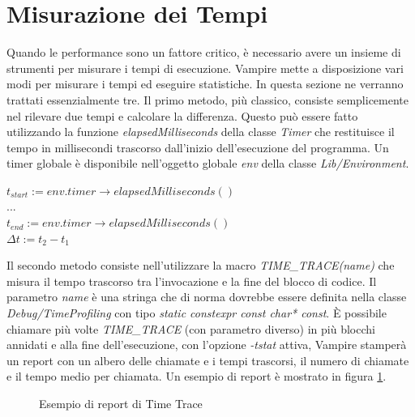 \documentclass[./main.tex]{subfiles}
\begin{document}
\section{Misurazione dei Tempi} \label{sec:vampire_time}
Quando le performance sono un fattore critico, è necessario avere un insieme di strumenti per misurare i tempi di esecuzione.
Vampire mette a disposizione vari modi per misurare i tempi ed eseguire statistiche. In questa sezione ne verranno trattati essenzialmente tre.
Il primo metodo, più classico, consiste semplicemente nel rilevare due tempi e calcolare la differenza.
Questo può essere fatto utilizzando la funzione \textit{elapsedMilliseconds} della classe \textit{Timer} 
che restituisce il tempo in millisecondi trascorso dall'inizio dell'esecuzione del programma. 
Un timer globale è disponibile nell'oggetto globale \textit{env} della classe \textit{Lib/Environment}.

$t_{start} := env.timer{\rightarrow}elapsedMilliseconds()$ \\
... \\
$t_{end} := env.timer{\rightarrow}elapsedMilliseconds()$ \\
$\Delta t := t_2 - t_1$

Il secondo metodo consiste nell'utilizzare la macro \textit{TIME\_TRACE(name)}
che misura il tempo trascorso tra l'invocazione e la fine del blocco di codice.
Il parametro \textit{name} è una stringa che di norma dovrebbe essere definita nella classe \textit{Debug/TimeProfiling} con tipo
\textit{static constexpr const char* const}.
È possibile chiamare più volte \textit{TIME\_TRACE} (con parametro diverso) in più blocchi annidati e alla fine dell'esecuzione, con l'opzione \textit{-tstat} attiva,
Vampire stamperà un report con un albero delle chiamate e i tempi trascorsi, il numero di chiamate e il tempo medio per chiamata.
Un esempio di report è mostrato in figura \ref{fig:time_trace_report}.

\begin{figure}[h]
    \centering
    \caption{Esempio di report di Time Trace}
    \label{fig:time_trace_report}
\end{figure}
\end{document}
